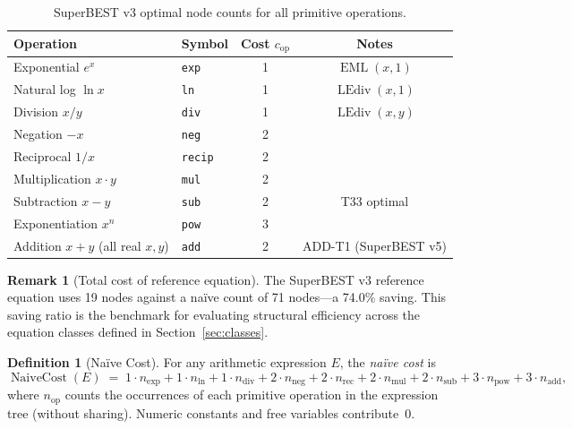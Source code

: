\documentclass[12pt,a4paper]{article}
\theoremstyle{definition}
\newtheorem{definition}[theorem]{Definition}
\newtheorem{remark}[theorem]{Remark}
\newcommand{\EML}{\operatorname{EML}}
\newcommand{\LEdiv}{\operatorname{LEdiv}}
\newcommand{\NC}{\operatorname{NaiveCost}}
\begin{document}
\begin{table}[h]
\centering
\caption{SuperBEST v3 optimal node counts for all primitive operations.}
\label{tab:superbest3}
\smallskip
\begin{tabular}{@{}llcc@{}}
\toprule
\textbf{Operation} & \textbf{Symbol} &
  \textbf{Cost $c_{\mathrm{op}}$} & \textbf{Notes} \\
\midrule
Exponential $e^x$           & \texttt{exp}   & 1 & $\EML(x,1)$ \\
Natural log $\ln x$         & \texttt{ln}    & 1 & $\LEdiv(x,1)$ \\
Division $x/y$              & \texttt{div}   & 1 & $\LEdiv(x,y)$ \\
Negation $-x$               & \texttt{neg}   & 2 & \\
Reciprocal $1/x$            & \texttt{recip} & 2 & \\
Multiplication $x \cdot y$  & \texttt{mul}   & 2 & \\
Subtraction $x - y$         & \texttt{sub}   & 2 & T33 optimal \\
Exponentiation $x^n$        & \texttt{pow}   & 3 & \\
Addition $x + y$ (all real $x,y$) & \texttt{add} & 2 & ADD-T1 (SuperBEST v5) \\
\bottomrule
\end{tabular}
\end{table}

\begin{remark}[Total cost of reference equation]
\label{rem:19node}
The SuperBEST v3 reference equation uses 19 nodes against a na\"{i}ve count of
71 nodes---a 74.0\% saving.  This saving ratio is the benchmark for evaluating
structural efficiency across the equation classes defined in
Section~\ref{sec:classes}.
\end{remark}

\begin{definition}[Na\"{i}ve Cost]
\label{def:NC}
For any arithmetic expression $E$, the \emph{na\"{i}ve cost} is
\[
  \NC(E) \;=\;
    1 \cdot n_{\exp}
  + 1 \cdot n_{\ln}
  + 1 \cdot n_{\mathrm{div}}
  + 2 \cdot n_{\mathrm{neg}}
  + 2 \cdot n_{\mathrm{rec}}
  + 2 \cdot n_{\mathrm{mul}}
  + 2 \cdot n_{\mathrm{sub}}
  + 3 \cdot n_{\mathrm{pow}}
  + 3 \cdot n_{\mathrm{add}},
\]
where $n_{\mathrm{op}}$ counts the occurrences of each primitive operation in the
expression tree (without sharing).  Numeric constants and free variables
contribute~0.
\end{definition}
\end{document}
